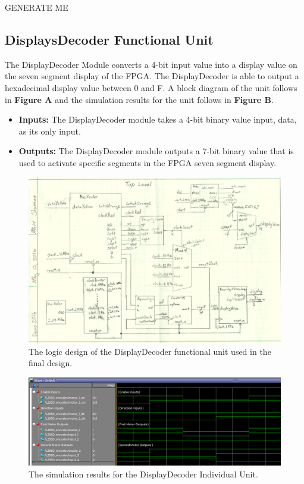 \documentclass[a4paper]{article}
\begin{document}
\clearpage


GENERATE ME




\clearpage



\subsection{DisplaysDecoder Functional Unit}
The DisplayDecoder Module converts a 4-bit input value into a display value on the seven segment display of the FPGA. The DisplayDecoder is
able to output a hexadecimal display value between 0 and F. A block diagram of the unit follows in \textbf{Figure A} and the simulation results for the unit follows in \textbf{Figure B}.
\begin{itemize}
  \item \textbf{Inputs:  } The DisplayDecoder module takes a 4-bit binary value input, data, as its only input.
  \item \textbf{Outputs: } The DisplayDecoder module outputs a 7-bit binary value that is used to activate specific segments in the FPGA seven segment display.
\end{itemize}
\begin{figure}[h]
  \centering
    \includegraphics[width=.8\textwidth]{images/functional_1.png}
	\caption{The logic design of the DisplayDecoder functional unit used in the final design.}
    \label{fig:functional-1}
\end{figure}
\begin{figure}[h]
  \centering
    \includegraphics[width=.98\textwidth]{sims/functional_1.png}
	\caption{The simulation results for the DisplayDecoder Individual Unit.}
    \label{fig:top-level-sim}
\end{figure}
\end{document}
